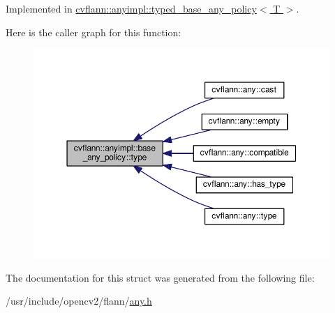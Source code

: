 Implemented in \hyperlink{structcvflann_1_1anyimpl_1_1typed__base__any__policy_a32be4fa59718ae729b4b988a12c2245a}{cvflann\-::anyimpl\-::typed\-\_\-base\-\_\-any\-\_\-policy$<$ T $>$}.



Here is the caller graph for this function\-:\nopagebreak
\begin{figure}[H]
\begin{center}
\leavevmode
\includegraphics[width=350pt]{structcvflann_1_1anyimpl_1_1base__any__policy_a73e9e84ac08b0647fbcf1ee7ee2db117_icgraph}
\end{center}
\end{figure}




The documentation for this struct was generated from the following file\-:\begin{DoxyCompactItemize}
\item 
/usr/include/opencv2/flann/\hyperlink{any_8h}{any.\-h}\end{DoxyCompactItemize}
